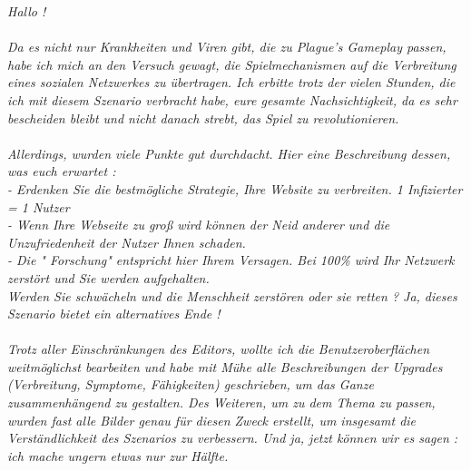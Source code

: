 \documentclass[10pt,a4paper]{article}
\begin{document}
\textit{Hallo !}\\
\\
\textit{Da es nicht nur Krankheiten und Viren gibt, die zu Plague's Gameplay passen, habe ich mich an den Versuch gewagt, die Spielmechanismen auf die Verbreitung eines sozialen Netzwerkes zu übertragen. Ich erbitte trotz der vielen Stunden, die ich mit diesem Szenario verbracht habe, eure gesamte Nachsichtigkeit, da es sehr bescheiden bleibt und nicht danach strebt, das Spiel zu revolutionieren.}\\
\\
\textit{Allerdings, wurden viele Punkte gut durchdacht. Hier eine Beschreibung dessen, was euch erwartet :}\\
\textit{- Erdenken Sie die bestmögliche Strategie, Ihre Website zu verbreiten. 1 Infizierter = 1 Nutzer}\\
\textit{- Wenn Ihre Webseite zu groß wird können der Neid anderer und die Unzufriedenheit der Nutzer Ihnen schaden.}\\
\textit{- Die " Forschung" entspricht hier Ihrem Versagen. Bei 100\% wird Ihr Netzwerk zerstört und Sie werden aufgehalten.}\\
\textit{Werden Sie schwächeln und die Menschheit zerstören oder sie retten ? Ja, dieses Szenario bietet ein alternatives Ende !}\\
\\
\textit{Trotz aller Einschränkungen des Editors, wollte ich die Benutzeroberflächen weitmöglichst bearbeiten und habe mit Mühe alle Beschreibungen der Upgrades (Verbreitung, Symptome, Fähigkeiten) geschrieben, um das Ganze zusammenhängend zu gestalten. Des Weiteren, um zu dem Thema zu passen, wurden fast alle Bilder genau für diesen Zweck erstellt, um insgesamt die Verständlichkeit des Szenarios zu verbessern. Und ja, jetzt können wir es sagen : ich mache ungern etwas nur zur Hälfte.}
\end{document}
